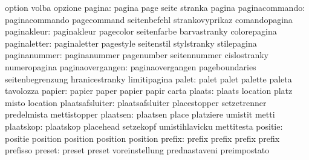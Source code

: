                            option                    volba
                           opzione
                   pagina: pagina                    page
                           seite                     stranka
                           pagina
           paginacommando: paginacommando            pagecommand
                           seitenbefehl              strankovyprikaz
                           comandopagina
              paginakleur: paginakleur               pagecolor
                           seitenfarbe               barvastranky
                           colorepagina
             paginaletter: paginaletter              pagestyle
                           seitenstil                stylstranky
                           stilepagina
             paginanummer: paginanummer              pagenumber
                           seitennummer              cislostranky
                           numeropagina
         paginaovergangen: paginaovergangen          pageboundaries
                           seitenbegrenzung          hranicestranky
                           limitipagina
                    palet: palet                     palet
                           palette                   paleta
                           tavolozza
                   papier: papier                    paper
                           papier                    papir
                           carta
                   plaats: plaats                    location
                           platz                     misto
                           location
          plaatsafsluiter: plaatsafsluiter           placestopper
                           setzetrenner              predelmista
                           mettistopper              %
                 plaatsen: plaatsen                  place
                           platziere                 umistit
                           metti                     %
                plaatskop: plaatskop                 placehead
                           setzekopf                 umistihlavicku
                           mettitesta                %
                  positie: positie                   position
                           position                  position
                           position                  %
                   prefix: prefix                    prefix
                           prefix                    prefix
                           prefisso
                   preset: preset                    preset
                           voreinstellung            prednastaveni
                           preimpostato              %
